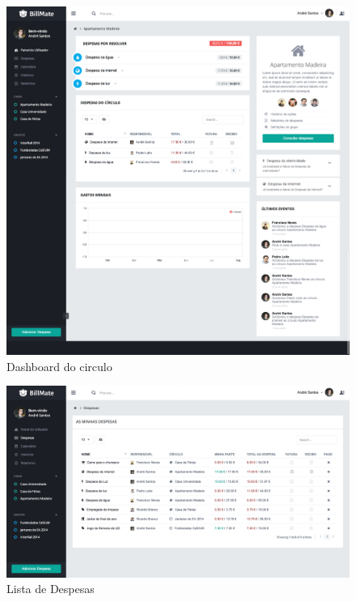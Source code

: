 \begin{figure}[H]
{
\includegraphics[width=.5\textwidth]{images/andre/dashboard_circle}
\caption{Dashboard do circulo}
}
\end{figure}

\begin{figure}[H]
{
\includegraphics[width=.5\textwidth]{images/andre/expenses}
\caption{Lista de Despesas}
}
\end{figure}

